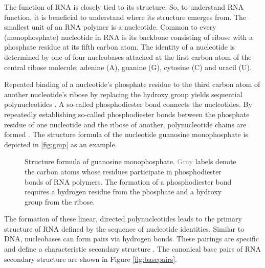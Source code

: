 \documentclass[../../master.tex]{subfiles}
\begin{document}
The function of RNA is closely tied to its structure.
So, to understand RNA function, it is beneficial to understand where its structure emerges from.
The smallest unit of an RNA polymer is a nucleotide.
Common to every (monophosphate) nucleotide in RNA is its backbone consisting of ribose with a phosphate residue at its fifth carbon atom.
The identity of a nucleotide is determined by one of four nucleobases attached at the first carbon atom of the central ribose molecule; adenine (A), guanine (G), cytosine (C) and uracil (U).

Repeated binding of a nucleotide's phosphate residue to the third carbon atom of another nucleotide's ribose by replacing the hydroxy group yields sequential polynucleotides \parencite{lodish_molecular_2000}.
A so-called phosphodiester bond connects the nucleotides.
By repeatedly establishing so-called phosphodiester bonds between the phosphate residue of one nucleotide and the ribose of another, polynucleotide chains are formed \parencite{lodish_molecular_2000}.
The structure formula of the nucleotide guanosine monophosphate is depicted in \autoref{fig:gmp} as an example.

\begin{figure}[!ht]
	\centering
	\footnotesize
	\caption[Structure of Guanosine Monophosphate]{
		Structure formula of guanosine monophosphate.
		\textcolor{gray}{Gray} labels denote the carbon atoms whose residues participate in phosphodiester bonds of RNA polymers. The formation of a phosphodiester bond requires a hydrogen residue from the phosphate and a hydroxy group from the ribose.
	}\label{fig:gmp}
\end{figure}

The formation of these linear, directed polynucleotides leads to the primary structure of RNA defined by the sequence of nucleotide identities.
Similar to DNA, nucleobases can form pairs via hydrogen bonds.
These pairings are specific and define a characteristic secondary structure \parencite{hofacker_rna_2005}.
The canonical base pairs of RNA secondary structure are shown in Figure \ref{fig:basepairs}.
\end{document}
